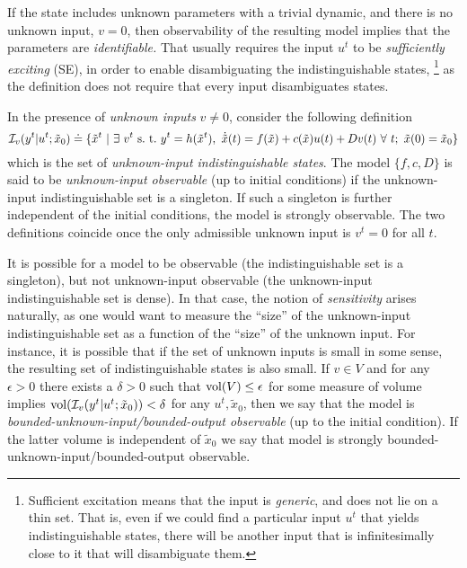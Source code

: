 \documentclass[]{article}
\begin{document}
If the state includes unknown parameters with a trivial dynamic, and there is no unknown input, $v = 0$, then observability of the resulting model implies that the parameters are {\em identifiable.} That usually requires the input $u^t$ to be {\em sufficiently exciting} (SE), in order to enable disambiguating the indistinguishable states,
\footnote{Sufficient excitation means that the input is {\em generic}, and does not lie on a thin set. That is, even if we could find a particular input $u^t$ that yields indistinguishable states, there will be another input that is infinitesimally close to it that will disambiguate them.} as the definition does not require that every input disambiguates states.

In the presence of {\em unknown inputs} $v \neq 0$, consider the following definition
\begin{equation}
{\cal I}_v(y^t | u^t; \tilde x_0) \doteq \{ {\tilde x}^t \ | \ \exists \ v^t \ {\rm s. \ t. } \ y^t = h(\tilde x^t), \ \dot {\tilde x}(t) = f({\tilde x}) + c({\tilde x}) u(t) + D v(t) \ \forall \ t; \ \tilde x(0) = \tilde x_0\}
\end{equation}
which is the set of {\em unknown-input indistinguishable states}. The model $\{f, c, D\}$ is said to be {\em unknown-input observable} (up to initial conditions) if the unknown-input indistinguishable set is a singleton. If such a singleton is further independent of the initial conditions, the model is strongly observable. The two definitions coincide once the only admissible unknown input is $v^t = 0$ for all $t$.

It is possible for a model to be observable (the indistinguishable set is a singleton), but not unknown-input observable (the unknown-input indistinguishable set is dense). In that case, the notion of {\em sensitivity} arises naturally, as one would want to measure the ``size'' of the unknown-input indistinguishable set as a function of the ``size'' of the unknown input. For instance, it is possible that if the set of unknown inputs is small in some sense, the resulting set of indistinguishable states is also small. If $v \in V$ and for any $\epsilon>0$ there exists a $\delta >0$ such that ${\rm vol}(V) \le \epsilon$ for some measure of volume implies ${\rm vol}({\cal I}_v(y^t | u^t; \tilde x_0)) < \delta$ for any $u^t, \tilde x_0$, then we say that the model is {\em bounded-unknown-input/bounded-output observable} (up to the initial condition). If the latter volume is independent of $\tilde x_0$ we say that model is strongly bounded-unknown-input/bounded-output observable.
\end{document}
